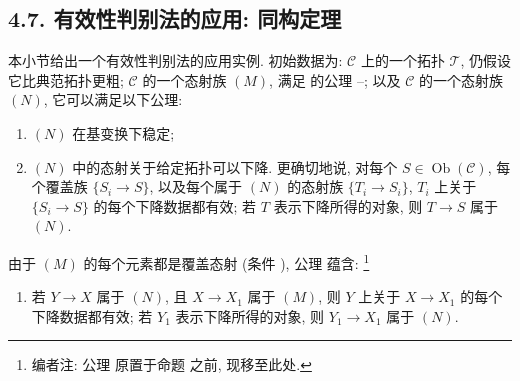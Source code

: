 
\setcounter{footnote}{45}

\subsection*{4.7. 有效性判别法的应用: 同构定理}

本小节给出一个有效性判别法的应用实例.
初始数据为: \(\mathscr C\) 上的一个拓扑 \(\mathcal T\),
仍假设它比典范拓扑更粗;
\(\mathscr C\) 的一个态射族 \((M)\),
满足  的公理
--;
以及 \(\mathscr C\) 的一个态射族 \((N)\), 它可以满足以下公理:
\begin{enumerate}
  \item[(a)]
  \((N)\) 在基变换下稳定;
  \item[\((f_{\mathcal T})\)]
  \((N)\) 中的态射关于给定拓扑可以下降.
  更确切地说, 对每个 \(S\in\operatorname{Ob}(\mathscr C)\),
  每个覆盖族 \(\{S_i\to S\}\), 以及每个属于 \((N)\) 的态射族
  \(\{T_i\to S_i\}\),
  \(T_i\) 上关于 \(\{S_i\to S\}\) 的每个下降数据都有效;
  若 \(T\) 表示下降所得的对象, 则 \(T\to S\) 属于 \((N)\).
\end{enumerate}

由于 \((M)\) 的每个元素都是覆盖态射
(条件 
),
公理 
蕴含:
\footnote{编者注: 公理
 原置于命题
 之前, 现移至此处.}
\begin{enumerate}
  \item[\((f_M)\)]
  若 \(Y\to X\) 属于 \((N)\), 且 \(X\to X_1\) 属于 \((M)\),
  则 \(Y\) 上关于 \(X\to X_1\) 的每个下降数据都有效;
  若 \(Y_1\) 表示下降所得的对象, 则 \(Y_1\to X_1\) 属于 \((N)\).
\end{enumerate}

